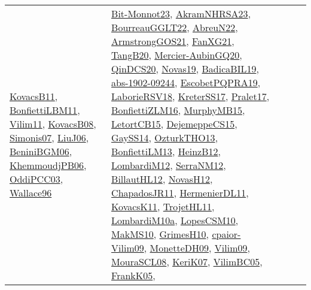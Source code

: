 {\begin{longtable}{lp{3cm}>{\raggedright}p{6cm}>{\raggedright}p{6cm}p{8cm}}
\href{articles/KovacsB11.pdf}{KovacsB11}\cite{KovacsB11}, \href{papers/BonfiettiLBM11.pdf}{BonfiettiLBM11}\cite{BonfiettiLBM11}, \href{papers/Vilim11.pdf}{Vilim11}\cite{Vilim11}, \href{articles/KovacsB08.pdf}{KovacsB08}\cite{KovacsB08}, \href{articles/Simonis07.pdf}{Simonis07}\cite{Simonis07}, \href{papers/LiuJ06.pdf}{LiuJ06}\cite{LiuJ06}, \href{papers/BeniniBGM06.pdf}{BeniniBGM06}\cite{BeniniBGM06}, \href{papers/KhemmoudjPB06.pdf}{KhemmoudjPB06}\cite{KhemmoudjPB06}, \href{papers/OddiPCC03.pdf}{OddiPCC03}\cite{OddiPCC03}, \href{articles/Wallace96.pdf}{Wallace96}\cite{Wallace96} & \href{papers/Bit-Monnot23.pdf}{Bit-Monnot23}\cite{Bit-Monnot23}, \href{articles/AkramNHRSA23.pdf}{AkramNHRSA23}\cite{AkramNHRSA23}, \href{articles/BourreauGGLT22.pdf}{BourreauGGLT22}\cite{BourreauGGLT22}, \href{articles/AbreuN22.pdf}{AbreuN22}\cite{AbreuN22}, \href{papers/ArmstrongGOS21.pdf}{ArmstrongGOS21}\cite{ArmstrongGOS21}, \href{articles/FanXG21.pdf}{FanXG21}\cite{FanXG21}, \href{papers/TangB20.pdf}{TangB20}\cite{TangB20}, \href{papers/Mercier-AubinGQ20.pdf}{Mercier-AubinGQ20}\cite{Mercier-AubinGQ20}, \href{articles/QinDCS20.pdf}{QinDCS20}\cite{QinDCS20}, \href{articles/Novas19.pdf}{Novas19}\cite{Novas19}, \href{papers/BadicaBIL19.pdf}{BadicaBIL19}\cite{BadicaBIL19}, \href{articles/abs-1902-09244.pdf}{abs-1902-09244}\cite{abs-1902-09244}, \href{articles/EscobetPQPRA19.pdf}{EscobetPQPRA19}\cite{EscobetPQPRA19}, \href{articles/LaborieRSV18.pdf}{LaborieRSV18}\cite{LaborieRSV18}, \href{articles/KreterSS17.pdf}{KreterSS17}\cite{KreterSS17}, \href{papers/Pralet17.pdf}{Pralet17}\cite{Pralet17}, \href{papers/BonfiettiZLM16.pdf}{BonfiettiZLM16}\cite{BonfiettiZLM16}, \href{papers/MurphyMB15.pdf}{MurphyMB15}\cite{MurphyMB15}, \href{articles/LetortCB15.pdf}{LetortCB15}\cite{LetortCB15}, \href{papers/DejemeppeCS15.pdf}{DejemeppeCS15}\cite{DejemeppeCS15}, \href{papers/GaySS14.pdf}{GaySS14}\cite{GaySS14}, \href{articles/OzturkTHO13.pdf}{OzturkTHO13}\cite{OzturkTHO13}, \href{papers/BonfiettiLM13.pdf}{BonfiettiLM13}\cite{BonfiettiLM13}, \href{papers/HeinzB12.pdf}{HeinzB12}\cite{HeinzB12}, \href{articles/LombardiM12.pdf}{LombardiM12}\cite{LombardiM12}, \href{papers/SerraNM12.pdf}{SerraNM12}\cite{SerraNM12}, \href{papers/BillautHL12.pdf}{BillautHL12}\cite{BillautHL12}, \href{articles/NovasH12.pdf}{NovasH12}\cite{NovasH12}, \href{papers/ChapadosJR11.pdf}{ChapadosJR11}\cite{ChapadosJR11}, \href{papers/HermenierDL11.pdf}{HermenierDL11}\cite{HermenierDL11}, \href{articles/KovacsK11.pdf}{KovacsK11}\cite{KovacsK11}, \href{articles/TrojetHL11.pdf}{TrojetHL11}\cite{TrojetHL11}, \href{articles/LombardiM10a.pdf}{LombardiM10a}\cite{LombardiM10a}, \href{articles/LopesCSM10.pdf}{LopesCSM10}\cite{LopesCSM10}, \href{papers/MakMS10.pdf}{MakMS10}\cite{MakMS10}, \href{papers/GrimesH10.pdf}{GrimesH10}\cite{GrimesH10}, \href{papers/cpaior-Vilim09.pdf}{cpaior-Vilim09}\cite{cpaior-Vilim09}, \href{papers/MonetteDH09.pdf}{MonetteDH09}\cite{MonetteDH09}, \href{papers/Vilim09.pdf}{Vilim09}\cite{Vilim09}, \href{papers/MouraSCL08.pdf}{MouraSCL08}\cite{MouraSCL08}, \href{papers/KeriK07.pdf}{KeriK07}\cite{KeriK07}, \href{articles/VilimBC05.pdf}{VilimBC05}\cite{VilimBC05}, \href{papers/FrankK05.pdf}{FrankK05}\cite{FrankK05}, 
\end{longtable}}
